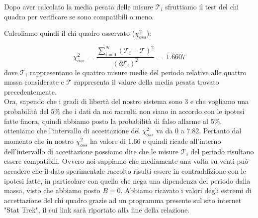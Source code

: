 Dopo aver calcolato la media pesata delle misure $\mathcal{T}_i$ sfruttiamo il test del chi quadro per verificare se sono compatibili o meno.


%
Calcoliamo quindi il chi quadro osservato ($\chi_{oss}^2$):

\begin{equation*}
	\chi_{oss}^2 \,=\, \frac{\sum_{i=0}^{N} (\mathcal{T}_i - \mathcal{T})^2}{(\delta \mathcal{T}_i)^2} \,=\, 1.6607
\end{equation*}
%
dove $\mathcal{T}_i$ rappresentano le quattro misure medie del periodo relative alle quattro massa considerate e $\mathcal{T}$ rappresenta il valore della media pesata trovato precedentemente.\\

Ora, sapendo che i gradi di libertà del nostro sistema sono 3 e che vogliamo una probabilità del $5\%$ che i dati da noi raccolti non siano in accordo con le ipotesi fatte finora, quindi abbiamo posto la probabilità di falso allarme al $5\%$, otteniamo che l'intervallo di accettazione del $\chi_{oss}^2$ va da 0 a 7.82. Pertanto dal momento che in nostro $\chi_{oss}^2$ ha valore di 1.66 e quindi ricade all'interno dell'intervallo di accettazione possiamo dire che le misure $\mathcal{T}_i$ del periodo risultano essere compatibili. Ovvero noi sappiamo che mediamente una volta su venti può accadere che il dato sperimentale raccolto risulti essere in contraddizione con le ipotesi fatte, in particolare con quella che nega una dipendenza del periodo dalla massa, visto che abbiamo posto $B = 0$.
Abbiamo ricavato i valori degli estremi di accettazione del chi quadro grazie ad un programma presente sul sito internet "Stat Trek", il cui link sarà riportato alla fine della relazione.